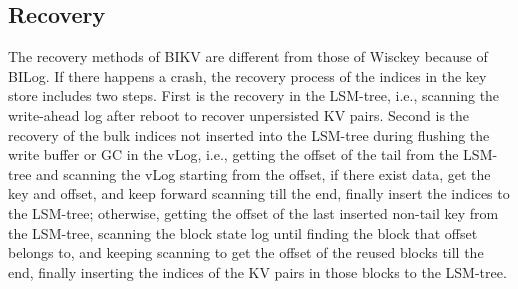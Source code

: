 \documentclass[sigconf]{acmart}
\begin{document}

\subsection{Recovery} \label{ss4}
%
The recovery methods of BIKV are different from those of Wisckey because of BILog. If there happens a crash, the recovery process of the indices in the key store includes two steps. First is the recovery in the LSM-tree, i.e., scanning the write-ahead log after reboot to recover unpersisted KV pairs. Second is the recovery of the bulk indices not inserted into the LSM-tree during flushing the write buffer or GC in the vLog, i.e., getting the offset of the tail from the LSM-tree and scanning the vLog starting from the offset, if there exist data, get the key and offset, and keep forward scanning till the end, finally insert the indices to the LSM-tree; otherwise, getting the offset of the last inserted non-tail key from the LSM-tree, scanning the block state log until finding the block that offset belongs to, and keeping scanning to get the offset of the reused blocks till the end, finally inserting the indices of the KV pairs in those blocks to the LSM-tree.
\end{document}
